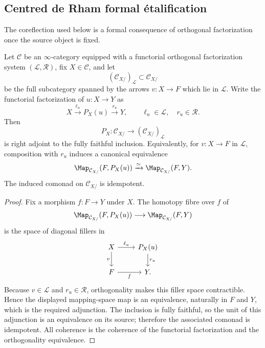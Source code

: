 \subsection{Centred de Rham formal \'etalification}

The coreflection used below is a formal consequence of orthogonal
factorization once the source object is fixed.

\begin{lemma}
\label{lem:fixed-source-ofs-coreflection}
Let $\mathcal C$ be an $\infty$-category equipped with a functorial
orthogonal factorization system $(\mathcal L,\mathcal R)$, fix
$X\in\mathcal C$, and let
\[
    (\mathcal C_{X/})_{\mathcal L}
    \subset
    \mathcal C_{X/}
\]
be the full subcategory spanned by the arrows $v:X\to F$ which lie in
$\mathcal L$.  Write the functorial factorization of
$u:X\to Y$ as
\[
    X\xrightarrow{\ell_u}P_X(u)\xrightarrow{r_u}Y,
    \qquad
    \ell_u\in\mathcal L,\quad r_u\in\mathcal R.
\]
Then
\[
    P_X:\mathcal C_{X/}\longrightarrow
    (\mathcal C_{X/})_{\mathcal L}
\]
is right adjoint to the fully faithful inclusion.  Equivalently, for
$v:X\to F$ in $\mathcal L$, composition with $r_u$ induces a canonical
equivalence
\[
    \Map_{\mathcal C_{X/}}
    (F,P_X(u))
    \xrightarrow{\simeq}
    \Map_{\mathcal C_{X/}}(F,Y).
\]
The induced comonad on $\mathcal C_{X/}$ is idempotent.
\end{lemma}

\begin{proof}
Fix a morphism $f:F\to Y$ under $X$.  The homotopy fibre over $f$ of
\[
    \Map_{\mathcal C_{X/}}(F,P_X(u))
    \longrightarrow
    \Map_{\mathcal C_{X/}}(F,Y)
\]
is the space of diagonal fillers in
\[
\begin{tikzcd}
X \arrow[r,"\ell_u"] \arrow[d,"v"'] &
P_X(u) \arrow[d,"r_u"]\\
F \arrow[r,"f"'] &
Y .
\end{tikzcd}
\]
Because $v\in\mathcal L$ and $r_u\in\mathcal R$, orthogonality makes this
filler space contractible.  Hence the displayed mapping-space map is an
equivalence, naturally in $F$ and $Y$, which is the required adjunction.
The inclusion is fully faithful, so the unit of this adjunction is an
equivalence on its source; therefore the associated comonad is idempotent.
All coherence is the coherence of the functorial factorization and the
orthogonality equivalence.
\end{proof}

